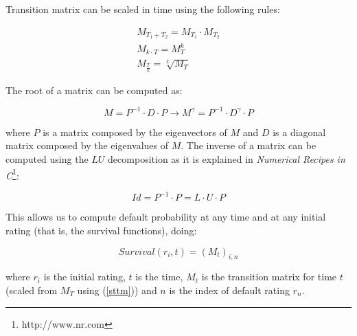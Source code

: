\documentclass[a4paper,12pt,final]{article}
\begin{document}
Transition matrix can be scaled in time using the following rules:

\begin{equation}
\label{sttm}
\begin{array}{l}
M_{T_1+T_2} = M_{T_1} \cdot M_{T_2} \nonumber \\
M_{k \cdot T} = M_{T}^k \nonumber \\
M_{\frac{T}{k}} = \sqrt[k]{M_{T}} \nonumber
\end{array}
\end{equation}

The root of a matrix can be computed as:

\begin{displaymath}
M = P^{-1} \cdot D \cdot P 
\longrightarrow
M^{\gamma} = P^{-1} \cdot D^{\gamma} \cdot P
\end{displaymath}

where $P$ is a matrix composed by the eigenvectors of $M$ and $D$ is a diagonal 
matrix composed by the eigenvalues of $M$. The inverse of a matrix can be 
computed using the $LU$ decomposition as it is explained in \emph{Numerical 
Recipes in C}\footnote{http://www.nr.com}:

\begin{displaymath}
Id = P^{-1} \cdot P = L \cdot U \cdot P
\end{displaymath}

This allows us to compute default probability at any time and at any initial 
rating (that is, the survival functions), doing:

\begin{displaymath}
Survival(r_i, t) = \left( M_t \right)_{i, n}
\end{displaymath}

where $r_i$ is the initial rating, $t$ is the time, $M_t$ is the transition 
matrix for time $t$ (scaled from $M_T$ using (\ref{sttm})) and $n$ is the 
index of default rating $r_n$.



\end{document}
